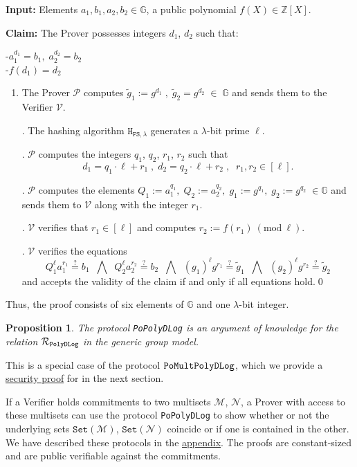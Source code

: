 \documentclass[11pt, lettersize, notitlepage, leqno, footskip=0.6cm]{article}
\newcommand{\bz}{\mathbb Z}
\newcommand{\ttt}{\texttt}
\newcommand{\bG}{\mathbb{G}}
\newcommand{\sett}{\ttt{Set}}
\newcommand{\wti}{\widetilde}
\newcommand{\mc}{\mathcal}
\newcommand{\mb}{\mathbb}
\newcommand{\lam}{\lambda}
\newcommand{\lamb}{\lambda}
\newcommand{\V}{\mc{V}}
\newcommand{\mcM}{\mc{M}}
\newcommand{\vs}{\vspace{-0.15cm}}
\newcommand{\Mod}[1]{\ (\mathrm{mod}\ #1)}
\newtheorem{Prop}[Thm]{Proposition}
\numberwithin{equation}{section}
\begin{document}
\noindent \textbf{Input:} Elements $a_1, b_1, a_2, b_2\in \mb{G}$, a public polynomial $f(X)\in\bz[X]$.

\noindent \textbf{Claim:} The Prover possesses integers $d_1$, $d_2$ such that:

\noindent -$a_1^{d_1} = b_1,\;  a_2^{d_2} = b_2$\\
-$f(d_1) = d_2$

\begin{enumerate}[wide, labelwidth=!, labelindent=0pt]\vs \item The Prover $\mc{P}$ computes $\wti{g}_1:= g^{d_1}\;,\; \wti{g}_2 = g^{d_2}\;\in\;\bG$ and sends them to the Verifier $\mc{V}$.

. The hashing algorithm $\ttt{H}_{\ttt{FS},\lam}$ generates a $\lamb$-bit prime $\ell$.

. $\mc{P}$ computes the integers $q_1$, $q_2$, $r_1$, $r_2$ such that \vs $$d_1 = q_1\cdot\ell+r_1\;,\; d_2 = q_2\cdot\ell+r_2\;,\;\; r_1,r_2\in [\ell].$$

. $\mc{P}$ computes the elements $Q_1:= a_1^{q_1},\;Q_2:= a_2^{q_2},\; g_1:= g^{q_1},\; g_2:= g^{q_2}\;\in\mb{G}$ and sends them to $\mc{V}$ along with the integer $r_1$.

. $\V$ verifies that $r_1\in [\ell]$ and computes $r_2:= f(r_1)\Mod{\ell}$.

. $\mc{V}$ verifies the equations \vs $$Q_1^{\ell}a_1^{r_1}\stackrel{?}{=} b_1\;\;\bigwedge\;\; Q_2^{\ell}a_2^{r_2}\stackrel{?}{=} b_2 \;\;\bigwedge\;\; (g_1)^{\ell}g^{r_1} \stackrel{?}{=} \wti{g}_1\;\;\bigwedge\;\; (g_2)^{\ell}g^{r_2} \stackrel{?}{=} \wti{g}_2 $$ and accepts the validity of the claim if and only if all equations hold.\qed \end{enumerate}

\noindent Thus, the proof consists of six elements of $\mb{G}$ and one $\lam$-bit integer.

\begin{Prop} The protocol \verb|PoPolyDLog| is an argument of knowledge for the relation $\mc{R}_{\tt{PolyDLog}}$ in the generic group
model.\end{Prop}

\begin{prf} This is a special case of the protocol \hyperlink{Mult}{$\tt{PoMultPolyDLog}$}, which we provide a \hyperlink{Generalized}{security proof} for in the next section.\end{prf}

If a Verifier holds commitments to two multisets $\mcM$, $\mc{N}$, a Prover with access to these multisets can use the protocol \verb|PoPolyDLog| to show whether or not the underlying sets $\sett{(\mcM)}$, $\sett{(\mc{N})}$ coincide or if one is contained in the other. We have described these protocols in the \hyperlink{Sets}{appendix}. The proofs are constant-sized and are public verifiable against the commitments.
\end{document}
